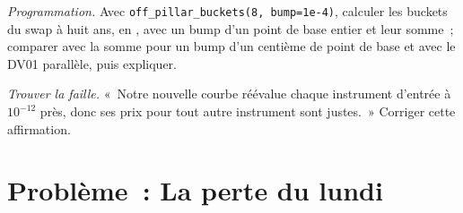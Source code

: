 \begin{exercise}[$\star\star\star$]\label{exo:rc:curve-construction:7}
\emph{Programmation.} Avec \texttt{off\_pillar\_buckets(8, bump=1e-4)}, calculer les
buckets du swap à huit ans, en , avec un bump d'un point de base entier
et leur somme~; comparer avec la somme pour un bump d'un centième de point de base et avec le
DV01 parallèle, puis expliquer.
\end{exercise}

\begin{exercise}[$\star\star\star$]\label{exo:rc:curve-construction:8}
\emph{Trouver la faille.} «~Notre nouvelle courbe réévalue chaque instrument d'entrée à $10^{-12}$ près, donc
ses prix pour tout autre instrument sont justes.~» Corriger cette affirmation.
\end{exercise}

\section{Problème~: La perte du lundi}

